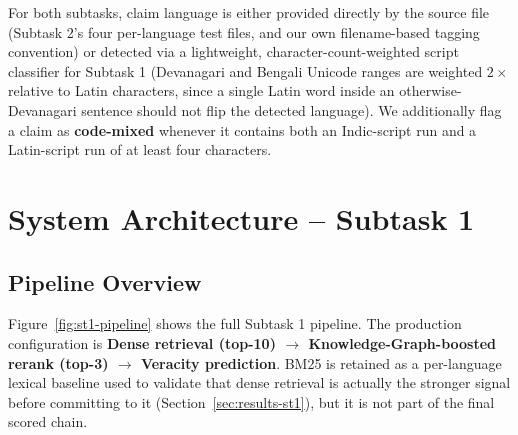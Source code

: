 \documentclass[
]{ceurart}
\begin{document}
For both subtasks, claim language is either provided directly by the
source file (Subtask 2's four per-language test files, and our own
filename-based tagging convention) or detected via a lightweight,
character-count-weighted script classifier for Subtask 1 (Devanagari
and Bengali Unicode ranges are weighted $2\times$ relative to Latin
characters, since a single Latin word inside an otherwise-Devanagari
sentence should not flip the detected language). We additionally flag a
claim as \textbf{code-mixed} whenever it contains both an Indic-script
run and a Latin-script run of at least four characters.

\section{System Architecture -- Subtask 1}
\label{sec:st1-arch}

\subsection{Pipeline Overview}

Figure~\ref{fig:st1-pipeline} shows the full Subtask 1 pipeline. The
production configuration is \textbf{Dense retrieval (top-10)
$\rightarrow$ Knowledge-Graph-boosted rerank (top-3) $\rightarrow$
Veracity prediction}. BM25 is retained as a per-language lexical
baseline used to validate that dense retrieval is actually the stronger
signal before committing to it (Section~\ref{sec:results-st1}), but it
is not part of the final scored chain.
\end{document}
